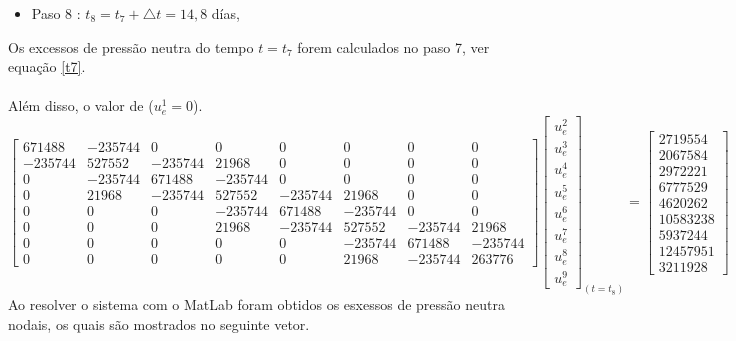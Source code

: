 \documentclass{article} %
\begin{document}
\begin{itemize}
	\item Paso 8 : \(t_8=t_7+\triangle t=14,8\) días,
\end{itemize}

Os excessos de pressão neutra do tempo \(t=t_7\) forem calculados no paso 7, ver equação \ref{t7}.\\
\\
\indent Além disso, o valor de (\(u_e^1=0\)).\\

\begin{equation*}
\begin{bmatrix}
671488& -235744& 0& 0& 0& 0& 0& 0\\
-235744&527552&-235744&21968& 0& 0& 0& 0\\
0&-235744&671488&-235744& 0& 0& 0& 0\\
0&21968&-235744&527552&-235744&21968& 0& 0\\
0&0&0& -235744&671488&-235744& 0& 0\\
0&0&0&21968&-235744&527552&-235744&21968\\
0&0&0&0&0&-235744&671488&-235744\\
0&0&0&0&0&21968&-235744&263776
\end{bmatrix}\begin{bmatrix}
u_e^2\\
u_e^3\\
u_e^4\\
u_e^5\\
u_e^6\\
u_e^7\\
u_e^8\\
u_e^9
\end{bmatrix}_{(t=t_8)}
=\begin{bmatrix}
2719554\\
2067584\\
2972221\\
6777529\\
4620262\\
10583238\\
5937244\\
12457951\\
3211928
\end{bmatrix}
\end{equation*}
\indent Ao resolver o sistema com o MatLab foram obtidos os esxessos de pressão neutra nodais, os quais são mostrados no seguinte vetor.
\end{document}
